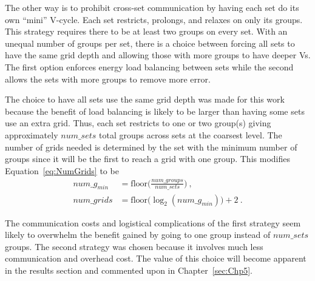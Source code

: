 The other way is to prohibit cross-set communication by having each set do its own ``mini'' V-cycle. Each set restricts, prolongs, and relaxes on only its groups. This strategy requires there to be at least two groups on every set. With an unequal number of groups per set, there is a choice between forcing all sets to have the same grid depth and allowing those with more groups to have deeper Vs. The first option enforces energy load balancing between sets while the second allows the sets with more groups to remove more error. 

The choice to have all sets use the same grid depth was made for this work because the benefit of load balancing is likely to be larger than having some sets use an extra grid. Thus, each set restricts to one or two group(s) giving approximately $num\_sets$ total groups across sets at the coarsest level. The number of grids needed is determined by the set with the minimum number of groups since it will be the first to reach a grid with one group. This modifies Equation~\eqref{eq:NumGrids} to be
\begin{align}
  num\_g_{min} &= \text{floor}\bigl(\frac{num\_groups}{num\_sets}\bigr) \:, \\
  num\_grids &= \text{floor}\bigl( \log_{2}(num\_g_{min}) \bigr) + 2 \:.
  \label{eq:multisetGrids}
\end{align}


The communication costs and logistical complications of the first strategy seem likely to overwhelm the benefit gained by going to one group instead of $num\_sets$ groups. The second strategy was chosen because it involves much less communication and overhead cost. The value of this choice will become apparent in the results section and commented upon in Chapter~\ref{sec:Chp5}. 

